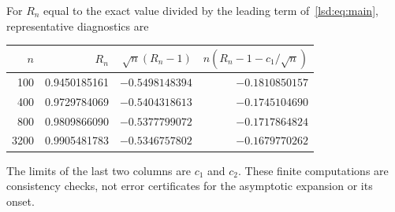 \documentclass[11pt]{article}
\theoremstyle{remark}\newtheorem{remark}{Remark}
\begin{document}
For $R_n$ equal to the exact value divided by the leading term of~\eqref{lsd:eq:main}, representative diagnostics are
\begin{center}
\begin{tabular}{r r r r}
\toprule
$n$&$R_n$&$\sqrt n(R_n-1)$&$n(R_n-1-c_1/\sqrt n)$\\
\midrule
100 &0.9450185161&$-0.5498148394$&$-0.1810850157$\\
400 &0.9729784069&$-0.5404318613$&$-0.1745104690$\\
800 &0.9809866090&$-0.5377799072$&$-0.1717864824$\\
3200&0.9905481783&$-0.5346757802$&$-0.1679770262$\\
\bottomrule
\end{tabular}
\end{center}
The limits of the last two columns are $c_1$ and $c_2$. These finite computations are consistency checks, not error certificates for the asymptotic expansion or its onset.
\end{document}
